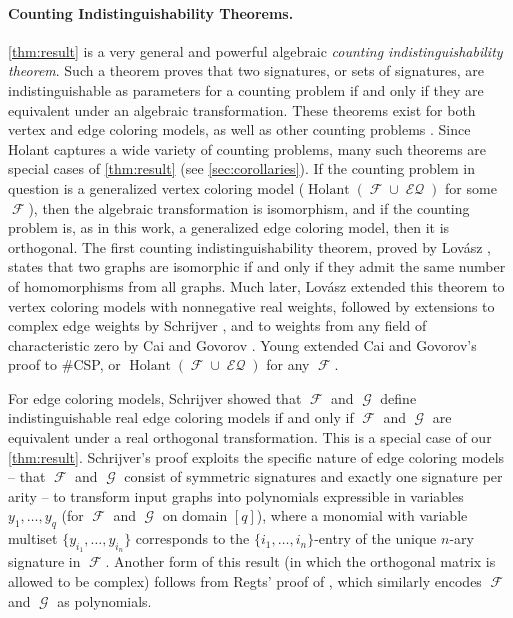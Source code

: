 \documentclass{article}
\DeclareMathOperator{\fc}{\mathcal{F}}
\DeclareMathOperator{\gc}{\mathcal{G}}
\DeclareMathOperator{\holant}{Holant}
\DeclareMathOperator{\eq}{\mathcal{EQ}}
\begin{document}
\paragraph{Counting Indistinguishability Theorems.}
\autoref{thm:result} is a very general and powerful algebraic 
\emph{counting indistinguishability theorem}. 
Such a theorem proves that two signatures, or sets of signatures, are indistinguishable
as parameters for a counting problem if and only if they are equivalent under an algebraic
transformation. These theorems exist for both vertex and edge coloring models, as well as other
counting problems \cite{dvorak_recognizing_2010, sherali-adams, dell, grohe_homomorphism_2022, lasserre}.
Since Holant captures a wide variety of counting problems,
many such theorems are special cases
of \autoref{thm:result} (see \autoref{sec:corollaries}).
If the counting problem in question is a generalized vertex coloring model ($\holant(\fc \cup \eq)$
for some $\fc$), then the algebraic transformation is isomorphism, and if the counting problem is,
as in this work, a generalized edge coloring model, then it is orthogonal.
The first counting indistinguishability theorem, proved by Lov\'{a}sz \cite{lovasz_operations}, 
states that two graphs are
isomorphic if and only if they admit the same number of homomorphisms from all graphs. Much later,
Lov\'{a}sz \cite{lovasz} extended this theorem to vertex coloring models with nonnegative real 
weights, followed by extensions to complex edge weights by Schrijver 
\cite{schrijver}, and to weights from any field of characteristic zero by Cai and Govorov 
\cite{cai-lovasz}. Young \cite{young2022equality} extended Cai and Govorov's proof to \#CSP, or
$\holant(\fc \cup \eq)$ for any $\fc$. 

For edge coloring models, Schrijver \cite{schrijver_graph_2008} showed that 
$\fc$ and $\gc$ define indistinguishable real edge coloring models if and only if
$\fc$ and $\gc$ are equivalent under a real orthogonal transformation. 
This is a special case of our \autoref{thm:result}.
Schrijver's proof exploits the specific nature of edge coloring models -- that $\fc$ and $\gc$ consist
of symmetric signatures and exactly one signature per arity -- to transform input graphs into polynomials
expressible in variables $y_1,\ldots,y_q$ (for $\fc$ and $\gc$ on domain $[q]$), 
where a monomial with variable multiset $\{y_{i_1},\ldots, y_{i_n}\}$ corresponds to the
$\{i_1,\ldots,i_n\}$-entry of the unique $n$-ary signature in $\fc$.
Another form of this result (in which the orthogonal matrix is allowed to be complex) 
follows from Regts' proof of 
\cite[Lemma 5]{regts_characterization_2013}, which similarly encodes $\fc$ and $\gc$ as polynomials.
\end{document}
